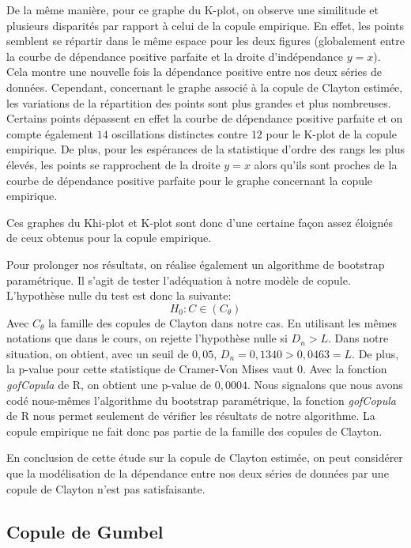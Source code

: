 De la même manière, pour ce graphe du K-plot, on observe une similitude et plusieurs disparités par rapport à celui de la copule empirique. En effet, les points semblent se répartir dans le même espace pour les deux figures (globalement entre la courbe de dépendance positive parfaite et la droite d'indépendance $y=x$). Cela montre une nouvelle fois la dépendance positive entre nos deux séries de données. Cependant, concernant le graphe associé à la copule de Clayton estimée, les variations de la répartition des points sont plus grandes et plus nombreuses. Certains points dépassent en effet la courbe de dépendance positive parfaite et on compte également $14$ oscillations distinctes contre $12$ pour le K-plot de la copule empirique. De plus, pour les espérances de la statistique d'ordre des rangs les plus élevés, les points se rapprochent de la droite $y=x$ alors qu'ils sont proches de la courbe de dépendance positive parfaite pour le graphe concernant la copule empirique.

Ces graphes du Khi-plot et K-plot sont donc d'une certaine façon assez éloignés de ceux obtenus pour la copule empirique.

Pour prolonger nos résultats, on réalise également un algorithme de bootstrap paramétrique. Il s'agit de tester l'adéquation à notre modèle de copule. L'hypothèse nulle du test est donc la suivante:
$$
H_0 : C \in (C_{\theta})
$$
Avec $C_{\theta}$ la famille des copules de Clayton dans notre cas. 
En utilisant les mêmes notations que dans le cours, on rejette l'hypothèse nulle si $D_n > L$. 
Dans notre situation, on obtient, avec un seuil de $0,05$, $D_n = 0,1340 > 0,0463 = L$. De plus, la p-value pour cette statistique de Cramer-Von Mises vaut $0$. Avec la fonction \textit{gofCopula} de R, on obtient une p-value de $0,0004$. 
Nous signalons que nous avons codé nous-mêmes l'algorithme du bootstrap paramétrique, la fonction \textit{gofCopula} de R nous permet seulement de vérifier les résultats de notre algorithme.
La copule empirique ne fait donc pas partie de la famille des copules de Clayton.

En conclusion de cette étude sur la copule de Clayton estimée, on peut considérer que la modélisation de la dépendance entre nos deux séries de données par une copule de Clayton n'est pas satisfaisante.

\subsection{Copule de Gumbel}

